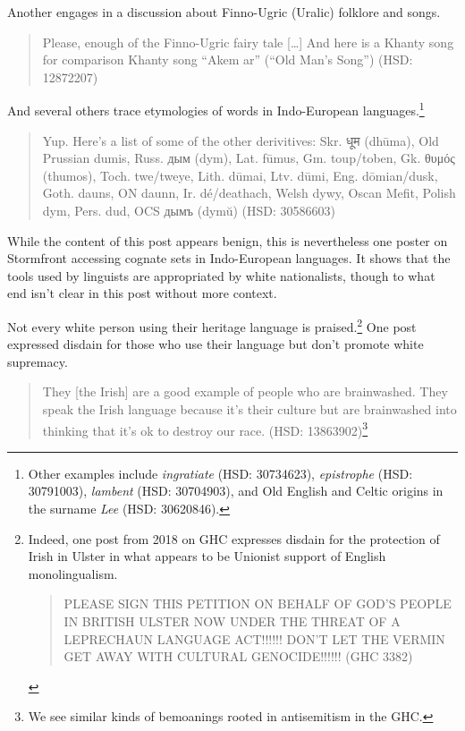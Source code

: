 \documentclass[output=paper,colorlinks,citecolor=brown]{langscibook}
\begin{document}
\noindent Another engages in a discussion about Finno-Ugric (Uralic) folklore and songs.

\begin{quote} Please, enough of the Finno-Ugric fairy tale {[}\ldots{]} And here is a Khanty song for comparison Khanty song ``Akem ar'' (``Old Man's Song'') (HSD: 12872207) 
\end{quote}

\noindent And several others trace etymologies of words in Indo-European languages.\footnote{Other examples include \emph{ingratiate} (HSD: 30734623), \emph{epistrophe} (HSD: 30791003), \emph{lambent} (HSD: 30704903), and Old English and Celtic origins in the surname \emph{Lee} (HSD: 30620846).}

\begin{quote} 
Yup. Here's a list of some of the other derivitives: Skr. {\foreignlanguage{Sanskrit}{धूम}} (dhūma), Old Prussian dumis, Russ. дым (dym), Lat. fūmus, Gm. toup/toben, Gk. θυμός (thumos), Toch. twe/tweye, Lith. dūmai, Ltv. dūmi, Eng. dōmian/dusk, Goth. dauns, ON daunn, Ir. dé/deathach, Welsh dywy, Oscan Mefit, Polish dym, Pers. dud, OCS дымъ (dymŭ) (HSD: 30586603) 
\end{quote}

\noindent While the content of this post appears benign, this is nevertheless one poster on Stormfront accessing cognate sets in Indo-European languages. It shows that the  tools used by linguists are appropriated by  white nationalists, though to what end isn't clear in this post without more context.

Not every white person using their  heritage language is praised.\footnote{Indeed, one post from 2018 on GHC expresses disdain for the protection of Irish in Ulster in what appears to be Unionist support of English monolingualism.

\begin{quote} 
PLEASE SIGN THIS PETITION ON BEHALF OF GOD'S PEOPLE IN BRITISH ULSTER NOW UNDER THE THREAT OF A LEPRECHAUN LANGUAGE ACT!!!!!! DON'T LET THE VERMIN GET AWAY WITH CULTURAL GENOCIDE!!!!!! (GHC 3382) 
\end{quote}} One post expressed disdain for those who use their language but don't promote white supremacy.

\begin{quote}
They {[}the Irish{]} are a good example of people who are brainwashed. They speak the Irish language because it's their culture but are brainwashed into thinking that it's ok to destroy our race. (HSD: 13863902)\footnote{We see similar kinds of bemoanings rooted in antisemitism in the GHC.}
\end{quote}
\end{document}
